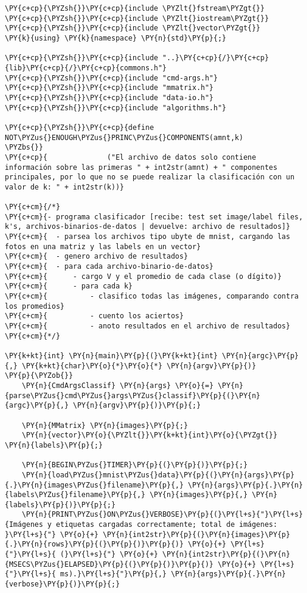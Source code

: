 \begin{Verbatim}[commandchars=\\\{\}]
\PY{c+cp}{\PYZsh{}}\PY{c+cp}{include \PYZlt{}fstream\PYZgt{}}
\PY{c+cp}{\PYZsh{}}\PY{c+cp}{include \PYZlt{}iostream\PYZgt{}}
\PY{c+cp}{\PYZsh{}}\PY{c+cp}{include \PYZlt{}vector\PYZgt{}}
\PY{k}{using} \PY{k}{namespace} \PY{n}{std}\PY{p}{;}

\PY{c+cp}{\PYZsh{}}\PY{c+cp}{include "..}\PY{c+cp}{/}\PY{c+cp}{lib}\PY{c+cp}{/}\PY{c+cp}{commons.h"}
\PY{c+cp}{\PYZsh{}}\PY{c+cp}{include "cmd-args.h"}
\PY{c+cp}{\PYZsh{}}\PY{c+cp}{include "mmatrix.h"}
\PY{c+cp}{\PYZsh{}}\PY{c+cp}{include "data-io.h"}
\PY{c+cp}{\PYZsh{}}\PY{c+cp}{include "algorithms.h"}

\PY{c+cp}{\PYZsh{}}\PY{c+cp}{define		NOT\PYZus{}ENOUGH\PYZus{}PRINC\PYZus{}COMPONENTS(amnt,k)		\PYZbs{}}
\PY{c+cp}{				("El archivo de datos solo contiene información sobre las primeras " + int2str(amnt) + " componentes principales, por lo que no se puede realizar la clasificación con un valor de k: " + int2str(k))}

\PY{c+cm}{/*}
\PY{c+cm}{- programa clasificador [recibe: test set image/label files, k's, archivos-binarios-de-datos | devuelve: archivo de resultados]}
\PY{c+cm}{	- parsea los archivos tipo ubyte de mnist, cargando las fotos en una matriz y las labels en un vector}
\PY{c+cm}{	- genero archivo de resultados}
\PY{c+cm}{	- para cada archivo-binario-de-datos}
\PY{c+cm}{		- cargo V y el promedio de cada clase (o dígito)}
\PY{c+cm}{		- para cada k}
\PY{c+cm}{			- clasifico todas las imágenes, comparando contra los promedios}
\PY{c+cm}{			- cuento los aciertos}
\PY{c+cm}{			- anoto resultados en el archivo de resultados}
\PY{c+cm}{*/}

\PY{k+kt}{int} \PY{n}{main}\PY{p}{(}\PY{k+kt}{int} \PY{n}{argc}\PY{p}{,} \PY{k+kt}{char}\PY{o}{*}\PY{o}{*} \PY{n}{argv}\PY{p}{)}
\PY{p}{\PYZob{}}
	\PY{n}{CmdArgsClassif} \PY{n}{args} \PY{o}{=} \PY{n}{parse\PYZus{}cmd\PYZus{}args\PYZus{}classif}\PY{p}{(}\PY{n}{argc}\PY{p}{,} \PY{n}{argv}\PY{p}{)}\PY{p}{;}

	\PY{n}{MMatrix} \PY{n}{images}\PY{p}{;}
	\PY{n}{vector}\PY{o}{\PYZlt{}}\PY{k+kt}{int}\PY{o}{\PYZgt{}} \PY{n}{labels}\PY{p}{;}
	
	\PY{n}{BEGIN\PYZus{}TIMER}\PY{p}{(}\PY{p}{)}\PY{p}{;}
	\PY{n}{load\PYZus{}mnist\PYZus{}data}\PY{p}{(}\PY{n}{args}\PY{p}{.}\PY{n}{images\PYZus{}filename}\PY{p}{,} \PY{n}{args}\PY{p}{.}\PY{n}{labels\PYZus{}filename}\PY{p}{,} \PY{n}{images}\PY{p}{,} \PY{n}{labels}\PY{p}{)}\PY{p}{;}
	\PY{n}{PRINT\PYZus{}ON\PYZus{}VERBOSE}\PY{p}{(}\PY{l+s}{"}\PY{l+s}{Imágenes y etiquetas cargadas correctamente; total de imágenes: }\PY{l+s}{"} \PY{o}{+} \PY{n}{int2str}\PY{p}{(}\PY{n}{images}\PY{p}{.}\PY{n}{rows}\PY{p}{(}\PY{p}{)}\PY{p}{)} \PY{o}{+} \PY{l+s}{"}\PY{l+s}{ (}\PY{l+s}{"} \PY{o}{+} \PY{n}{int2str}\PY{p}{(}\PY{n}{MSECS\PYZus{}ELAPSED}\PY{p}{(}\PY{p}{)}\PY{p}{)} \PY{o}{+} \PY{l+s}{"}\PY{l+s}{ ms).}\PY{l+s}{"}\PY{p}{,} \PY{n}{args}\PY{p}{.}\PY{n}{verbose}\PY{p}{)}\PY{p}{;}


\end{Verbatim}
